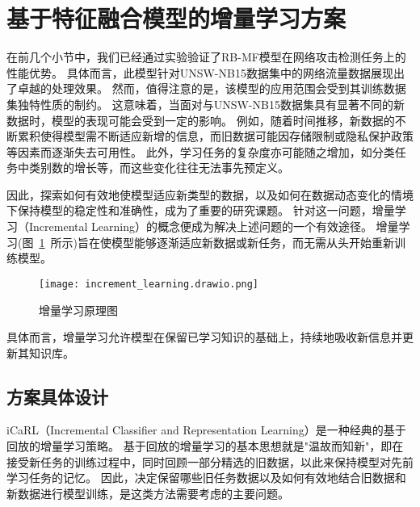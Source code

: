 \section{基于特征融合模型的增量学习方案}
在前几个小节中，我们已经通过实验验证了RB-MF模型在网络攻击检测任务上的性能优势。
具体而言，此模型针对UNSW-NB15数据集中的网络流量数据展现出了卓越的处理效果。
然而，值得注意的是，该模型的应用范围会受到其训练数据集独特性质的制约。
这意味着，当面对与UNSW-NB15数据集具有显著不同的新数据时，模型的表现可能会受到一定的影响。
例如，随着时间推移，新数据的不断累积使得模型需不断适应新增的信息，而旧数据可能因存储限制或隐私保护政策等因素而逐渐失去可用性。
此外，学习任务的复杂度亦可能随之增加，如分类任务中类别数的增长等，而这些变化往往无法事先预定义。\par

因此，探索如何有效地使模型适应新类型的数据，以及如何在数据动态变化的情境下保持模型的稳定性和准确性，成为了重要的研究课题。
针对这一问题，增量学习（Incremental Learning）的概念便成为解决上述问题的一个有效途径。
增量学习(图~\ref{fig:incremental_learning}~所示)旨在使模型能够逐渐适应新数据或新任务，而无需从头开始重新训练模型。
\begin{figure}[htbp]
	\centering
	\texttt{[image: increment\_learning.drawio.png]}
	\caption{增量学习原理图}
	\label{fig:incremental_learning}
\end{figure}
具体而言，增量学习允许模型在保留已学习知识的基础上，持续地吸收新信息并更新其知识库。

\subsection{方案具体设计}
iCaRL（Incremental Classifier and Representation Learning）\cite{rebuffi2017icarl}是一种经典的基于回放的增量学习策略。
基于回放的增量学习的基本思想就是"温故而知新"，即在接受新任务的训练过程中，同时回顾一部分精选的旧数据，以此来保持模型对先前学习任务的记忆。
因此，决定保留哪些旧任务数据以及如何有效地结合旧数据和新数据进行模型训练，是这类方法需要考虑的主要问题。\par

